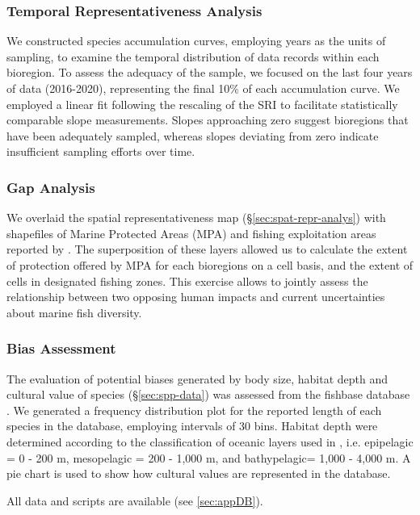 \documentclass[12pt,authoryear]{elsarticle}
\begin{document}
\subsubsection{Temporal Representativeness Analysis}
\label{sec:temp-repr-analys}

We constructed species accumulation curves, employing years as the units of sampling, to examine the temporal distribution of data records within each bioregion. To assess the adequacy of the sample, we focused on the last four years of data (2016-2020), representing the final 10\% of each accumulation curve. We employed a linear fit following the rescaling of the SRI to facilitate statistically comparable slope measurements. Slopes approaching zero suggest bioregions that have been adequately sampled, whereas slopes deviating from zero indicate insufficient sampling efforts over time.

\subsubsection{Gap Analysis}
\label{sec:gap-analysis}
We overlaid the spatial representativeness map (\S \ref{sec:spat-repr-analys}) with shapefiles of Marine Protected Areas (MPA) \citep{wcmc2022} and fishing exploitation areas reported by \citep{fao2014}. The superposition of these layers allowed us to calculate the extent of protection offered by MPA for each  bioregions on a cell basis, and the extent of cells in designated fishing zones. This exercise allows to jointly assess the relationship between two opposing human impacts and current uncertainties about marine fish diversity. 

\subsubsection{Bias Assessment}
\label{sec:bias-assessment}
The evaluation of potential biases generated by body size, habitat depth and cultural value of species (\S \ref{sec:spp-data}) was assessed from the fishbase database \citep{froese2021fishbase}. We generated a frequency distribution plot for the reported length of each species in the database, employing intervals of 30 bins. Habitat depth were determined according to the classification of oceanic layers used in  \citealt{costello2010} , i.e. epipelagic = 0 - 200 m, mesopelagic = 200 - 1,000 m, and bathypelagic= 1,000 - 4,000 m.
A pie chart is used to show how cultural values are represented in the database.

All data and scripts are available (see \ref{sec:appDB}).
\end{document}
